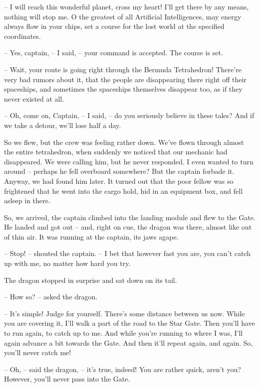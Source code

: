 \documentclass[ebook,oneside,final,openright]{memoir}
\begin{document}
– I will reach this wonderful planet, cross my heart! I’ll get there by any means, nothing will stop me. O the greatest of all Artificial Intelligences, may energy always flow in your chips, set a course for the lost world at the specified coordinates.\par
– Yes, captain, – I said, – your command is accepted. The course is set.\par
– Wait, your route is going right through the Bermuda Tetrahedron! There’re very bad rumors about it, that the people are disappearing there right off their spaceships, and sometimes the spaceships themselves disappear too, as if they never existed at all.\par
– Oh, come on, Captain, – I said, – do you seriously believe in these tales? And if we take a detour, we’ll lose half a day.\par
\par
So we flew, but the crew was feeling rather down. We’ve flown through almost the entire tetrahedron, when suddenly we noticed that our mechanic had disappeared. We were calling him, but he never responded. I even wanted to turn around – perhaps he fell overboard somewhere? But the captain forbade it. Anyway, we had found him later. It turned out that the poor fellow was so frightened that he went into the cargo hold, hid in an equipment box, and fell asleep in there.\par
\par
So, we arrived, the captain climbed into the landing module and flew to the Gate. He landed and got out – and, right on cue, the dragon was there, almost like out of thin air. It was running at the captain, its jaws agape.\par
– Stop! – shouted the captain. – I bet that however fast you are, you can’t catch up with me, no matter how hard you try.\par
The dragon stopped in surprise and sat down on its tail.\par
– How so? – asked the dragon.\par
– It’s simple! Judge for yourself. There’s some distance between us now. While you are covering it, I’ll walk a part of the road to the Star Gate. Then you’ll have to run again, to catch up to me. And while you’re running to where I was, I’ll again advance a bit towards the Gate. And then it’ll repeat again, and again. So, you’ll never catch me!\par
– Oh, – said the dragon, – it’s true, indeed! You are rather quick, aren’t you? However, you’ll never pass into the Gate.\par
\end{document}
